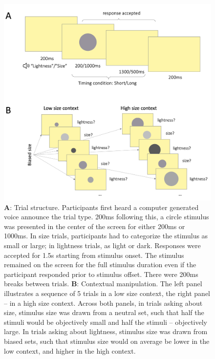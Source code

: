 \documentclass[a4paper, nobind]{templates/ociamthesis}
\begin{document}
\begin{figure}

{\centering \includegraphics[width=1\linewidth]{figures/cat-trial-a} 

}

\caption[Experiment 1, Trial structure]{$\textbf{A:}$ Trial structure. Participants first heard a computer generated voice announce the trial type. 200ms following this, a circle stimulus was presented in the center of the screen for either 200ms or 1000ms. In size trials, participants had to categorize the stimulus as small or large; in lightness trials, as light or dark. Responses were accepted for 1.5s starting from stimulus onset. The stimulus remained on the screen for the full stimulus duration even if the participant responded prior to stimulus offset. There were 200ms breaks between trials. $\textbf{B:}$ Contextual manipulation. The left panel illustrates a sequence of 5 trials in a low size context, the right panel -- in a high size context. Across both panels, in trials asking about size, stimulus size was drawn from a neutral set, such that half the stimuli would be objectively small and half the stimuli -- objectively large. In trials asking about lightness, stimulus size was drawn from biased sets, such that stimulus size would on average be lower in the low context, and higher in the high context.}\label{fig:cat-trial-a}
\end{figure}
\end{document}
